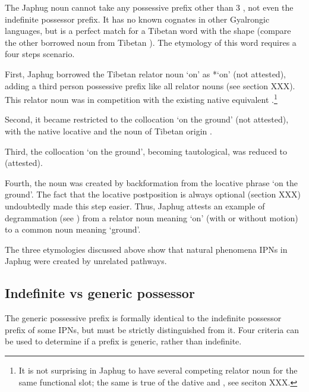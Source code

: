  
The Japhug noun  cannot take any possessive prefix other than 3\sg{} , not even the indefinite possessor prefix. It has no known cognates in other Gyalrongic languages, but is a perfect match for a Tibetan word with the shape  (compare the other borrowed noun  from Tibetan ). The etymology of this word requires a four steps scenario.

First, Japhug borrowed the Tibetan relator noun   `on' as  *`on' (not attested), adding a third person possessive prefix like all relator nouns (see section XXX). This relator noun was in competition with the existing native equivalent .\footnote{It is not surprising in Japhug to have several competing relator noun for the same functional slot; the same is true of the dative  and , see seciton XXX. }
  
  Second, it  became restricted to the collocation  `on the ground' (not attested), with the native locative  and the  noun of Tibetan origin .
  
    Third, the collocation  `on the ground', becoming tautological, was reduced to  (attested).
 
 Fourth, the noun  was created by backformation from the locative phrase  `on the ground'. The fact that the locative postposition  is always optional (section XXX) undoubtedly made this step easier.  Thus, Japhug attests an example of degrammation (see \citealt[135]{norde09degrammaticalization}) from a relator noun meaning `on' (with or without motion) to a common noun meaning `ground'. 

The three etymologies discussed above show that natural phenomena IPNs in Japhug were created by unrelated pathways.

\subsection{Indefinite vs generic possessor} \label{sec:indef.genr.poss}
The generic possessive prefix  is formally identical to the indefinite possessor prefix of some IPNs, but must be strictly distinguished from it. Four criteria can be used to determine if a  prefix is generic, rather than indefinite.

